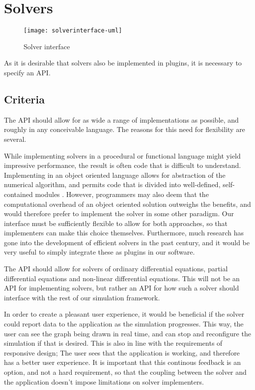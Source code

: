 \documentclass[../../main.tex]{subfiles}
\begin{document}
\section{Solvers}

\begin{figure}[h]
  \centering
  \texttt{[image: solverinterface-uml]}
  \caption{Solver interface}
  \label{fig:solver-interface}
\end{figure}

As it is desirable that solvers also be implemented in plugins, it is necessary to specify an API.

\subsection{Criteria}

The API should allow for as wide a range of implementations as possible, and roughly in any conceivable language.
The reasons for this need for flexibility are several.

While implementing solvers in a procedural or functional language might yield impressive performance, the result is often code that is difficult to understand.
Implementing in an object oriented language allows for abstraction of the numerical algorithm, and permits code that is divided into well-defined, self-contained modules \cite{kees1999}.
However, programmers may also deem that the computational overhead of an object oriented solution outweighs the benefits, and would therefore prefer to implement the solver in some other paradigm.
Our interface must be sufficiently flexible to allow for both approaches, so that implementers can make this choice themselves.
Furthermore, much research has gone into the development of efficient solvers in the past century, and it would be very useful to simply integrate these as plugins in our software.

The API should allow for solvers of ordinary differential equations, partial differential equations and non-linear differential equations.
This will not be an API for implementing solvers, but rather an API for how such a solver should interface with the rest of our simulation framework.

In order to create a pleasant user experience, it would be beneficial if the solver could report data to the application as the simulation progresses.
This way, the user can see the graph being drawn in real time, and can stop and reconfigure the simulation if that is desired.
This is also in line with the requirements of responsive design; The user sees that the application is working, and therefore has a better user experience.
It is important that this continous feedback is an option, and not a hard requirement, so that the coupling between the solver and the application doesn't impose limitations on solver implementers.
\end{document}
